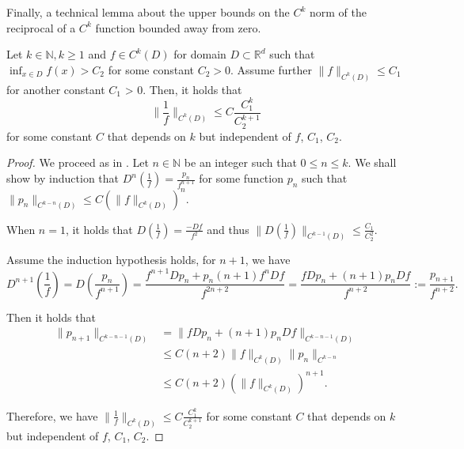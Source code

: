 Finally, a technical lemma about the upper bounds on the
$C^k$ norm of the reciprocal of a $C^k$ function bounded away from
zero.  
\begin{lemma}\label{lemma:NormReciprocal}
  Let $k \in \mathbb{N}, k \geq 1$ and $f \in C^k(D)$ for domain $D\subset\mathbb{R}^d$ such that
  $\inf_{x\in D} f(x) > C_2$ for some constant $C_2 > 0$. Assume
  further $\|f\|_{C^k(D)} \leq C_1$ for another constant $C_1$ > 0. Then, it
  holds that
$$\|\frac{1}{f}\|_{C^k(D)} \leq C\frac{C_1^k}{C_2^{k+1}}$$
for some constant $C$ that depends on $k$ but independent of $f$,
$C_1$, $C_2$.
\end{lemma}
\begin{proof}
  We proceed as in \cite[Lemma C.4 (iii)]{ZM1}.  Let
  $n\in\mathbb{N}$ be an integer such that $0 \leq n \leq k$. We shall
  show by induction that $D^n(\frac{1}{f}) = \frac{p_n}{f^{n+1}}$ for
  some function $p_n$ such that
  $\|p_n\|_{C^{k-n}(D)} \leq C(\|f\|_{C^k(D)})^n$.

  When $n = 1$, it holds that $D(\frac{1}{f}) = \frac{-Df}{f^2}$ and
  thus $\|D(\frac{1}{f})\|_{C^{k-1}(D)} \leq \frac{C_1}{C_2^2}$.

  Assume the induction hypothesis holds, for $n+1$, we have
  $$D^{n+1}(\frac{1}{f}) = D(\frac{p_n}{f^{n+1}}) = \frac{f^{n+1}Dp_n
    + p_n(n+1)f^nDf}{f^{2n+2}} = \frac{fDp_n + (n+1)p_nDf}{f^{n+2}} :=
  \frac{p_{n+1}}{f^{n+2}}.$$

  Then it holds that
  \begin{align*}
    \|p_{n+1}\|_{C^{k-n-1}(D)} &= \|fDp_n + (n+1)p_nDf\|_{C^{k-n-1}(D)}\\
                                    &\leq C(n+2)\|f\|_{C^k(D)}\|p_n\|_{C^{k-n}}\\
                                    &\leq C(n+2)(\|f\|_{C^k(D)})^{n+1}.
  \end{align*}

   
  Therefore, we have
  $\|\frac{1}{f}\|_{C^k(D)} \leq C\frac{C_1^k}{C_2^{k+1}}$ for
  some constant $C$ that depends on $k$ but independent of $f$, $C_1$,
  $C_2$.
\end{proof}



